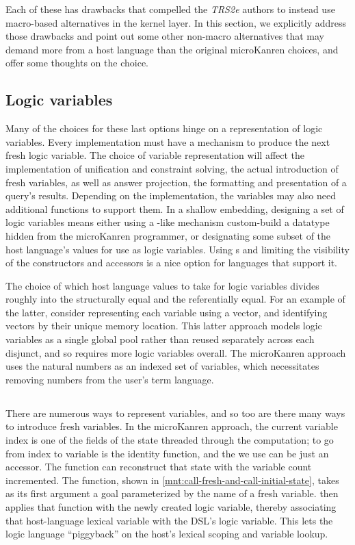 \documentclass[sigplan,balance=true,pbalance=true,natbib=false]{acmart}
\begin{document}
Each of these has drawbacks that compelled the \emph{TRS2e} authors to
instead use macro-based alternatives in the kernel layer. In this
section, we explicitly address those drawbacks and point out some
other non-macro alternatives that may demand more from a host language
than the original microKanren choices, and offer some thoughts on the
choice.

\subsection{Logic variables}

Many of the choices for these last options hinge on a representation
of logic variables. Every implementation must have a mechanism to
produce the next fresh logic variable. The choice of variable
representation will affect the implementation of unification and
constraint solving, the actual introduction of fresh variables, as
well as answer projection, the formatting and presentation of a
query's results. Depending on the implementation, the variables may
also need additional functions to support them. In a shallow
embedding, designing a set of logic variables means either using
a -like mechanism custom-build a datatype hidden
from the microKanren programmer, or designating some subset of the
host language's values for use as logic variables.
Using s and limiting the visibility of the
constructors and accessors is a nice option for languages that support
it.

The choice of which host language values to take for logic variables
divides roughly into the structurally equal and the referentially
equal. For an example of the latter, consider representing each
variable using a vector, and identifying vectors by their unique
memory location. This latter approach models logic variables as a
single global pool rather than reused separately across each disjunct,
and so requires more logic variables overall. The microKanren approach
uses the natural numbers as an indexed set of variables, which
necessitates removing numbers from the user's term language.

\subsection{}

There are numerous ways to represent variables, and so too are there
many ways to introduce fresh variables. In the microKanren approach,
the current variable index is one of the fields of the state threaded
through the computation; to go from index to variable is the identity
function, and the  we use can be just an
accessor. The function  can reconstruct that
state with the variable count incremented. The 
function, shown in \cref{mnt:call-fresh-and-call-initial-state}, takes
as its first argument a goal parameterized by the name of a fresh
variable.  then applies that function with the
newly created logic variable, thereby associating that host-language
lexical variable with the DSL's logic variable. This lets the logic
language \enquote{piggyback} on the host's lexical scoping and
variable lookup.
\end{document}
